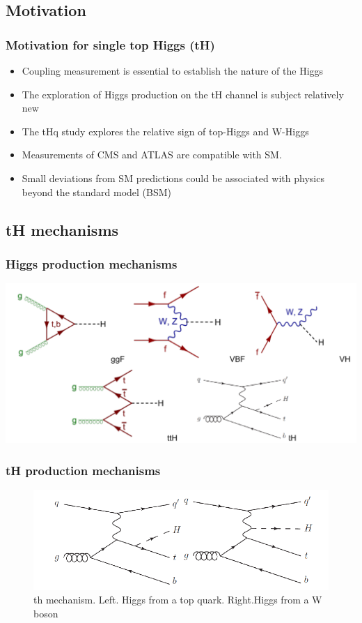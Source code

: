 \documentclass[11pt]{beamer}
\begin{document}
\begin{frame}
\subsection{Motivation}
\frametitle{Motivation  for single top Higgs (tH)}
\begin{itemize}
\item Coupling measurement is essential to establish the nature of the Higgs
\item The exploration of Higgs production on the tH channel is subject relatively new
\item The tHq study explores the relative sign of top-Higgs and W-Higgs
\item Measurements of CMS and ATLAS are compatible with SM.
\item Small deviations from SM predictions could be associated with physics beyond the
standard model (BSM)
\end{itemize}
\end{frame}

\begin{frame}
\section{tH mechanisms}
\frametitle{Higgs production mechanisms}
\begin{center}
\includegraphics[scale=0.4]{figures/pg.png}
\end{center}
\end{frame}

\begin{frame}
\frametitle{tH production mechanisms}
\begin{center}
\begin{figure}
\includegraphics[scale=0.4]{figures/tq.png}
\caption{th mechanism. Left. Higgs from a top quark. Right.Higgs from a W boson}
\end{figure}
\end{center}
\end{frame}
\end{document}
